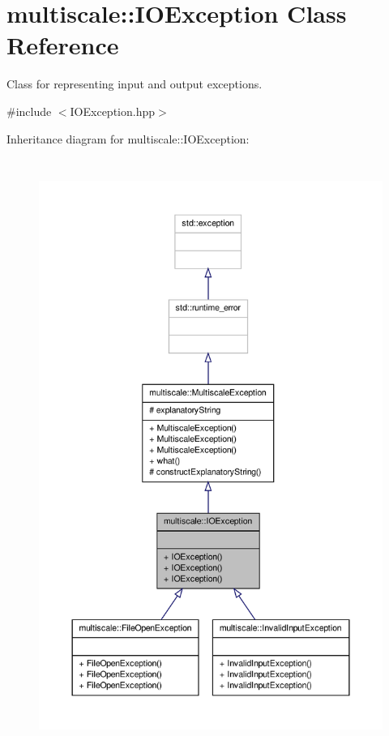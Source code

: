 \hypertarget{classmultiscale_1_1IOException}{\section{multiscale\-:\-:\-I\-O\-Exception \-Class \-Reference}
\label{classmultiscale_1_1IOException}
}


\-Class for representing input and output exceptions.  




{\ttfamily \#include $<$\-I\-O\-Exception.\-hpp$>$}



\-Inheritance diagram for multiscale\-:\-:\-I\-O\-Exception\-:
\nopagebreak
\begin{figure}[H]
\begin{center}
\leavevmode
\includegraphics[height=550pt]{classmultiscale_1_1IOException__inherit__graph}
\end{center}
\end{figure}


